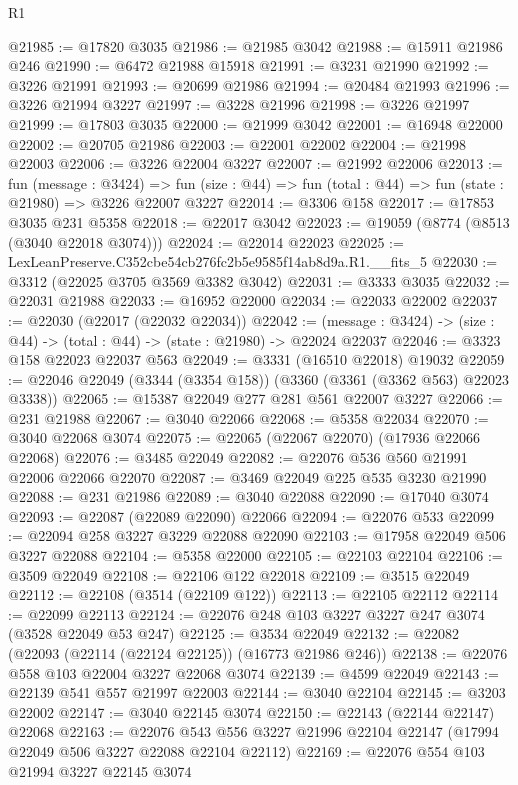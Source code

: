 \begin{lexlean}{R1}
\begin{coremodule}
@21985 := @17820 @3035
@21986 := @21985 @3042
@21988 := @15911 @21986 @246
@21990 := @6472 @21988 @15918
@21991 := @3231 @21990
@21992 := @3226 @21991
@21993 := @20699 @21986
@21994 := @20484 @21993
@21996 := @3226 @21994 @3227
@21997 := @3228 @21996
@21998 := @3226 @21997
@21999 := @17803 @3035
@22000 := @21999 @3042
@22001 := @16948 @22000
@22002 := @20705 @21986
@22003 := @22001 @22002
@22004 := @21998 @22003
@22006 := @3226 @22004 @3227
@22007 := @21992 @22006
@22013 := fun (message : @3424) =>
  fun (size : @44) => fun (total : @44) => fun (state : @21980) => @3226 @22007 @3227
@22014 := @3306 @158
@22017 := @17853 @3035 @231 @5358
@22018 := @22017 @3042
@22023 := @19059 (@8774 (@8513 (@3040 @22018 @3074)))
@22024 := @22014 @22023
@22025 := LexLeanPreserve.C352cbe54cb276fc2b5e9585f14ab8d9a.R1.__fits_5
@22030 := @3312 (@22025 @3705 @3569 @3382 @3042)
@22031 := @3333 @3035
@22032 := @22031 @21988
@22033 := @16952 @22000
@22034 := @22033 @22002
@22037 := @22030 (@22017 (@22032 @22034))
@22042 := (message : @3424) -> (size : @44) -> (total : @44) -> (state : @21980) -> @22024 @22037
@22046 := @3323 @158 @22023 @22037 @563
@22049 := @3331 (@16510 @22018) @19032
@22059 := @22046 @22049 (@3344 (@3354 @158)) (@3360 (@3361 (@3362 @563) @22023 @3338))
@22065 := @15387 @22049 @277 @281 @561 @22007 @3227
@22066 := @231 @21988
@22067 := @3040 @22066
@22068 := @5358 @22034
@22070 := @3040 @22068 @3074
@22075 := @22065 (@22067 @22070) (@17936 @22066 @22068)
@22076 := @3485 @22049
@22082 := @22076 @536 @560 @21991 @22006 @22066 @22070
@22087 := @3469 @22049 @225 @535 @3230 @21990
@22088 := @231 @21986
@22089 := @3040 @22088
@22090 := @17040 @3074
@22093 := @22087 (@22089 @22090) @22066
@22094 := @22076 @533
@22099 := @22094 @258 @3227 @3229 @22088 @22090
@22103 := @17958 @22049 @506 @3227 @22088
@22104 := @5358 @22000
@22105 := @22103 @22104
@22106 := @3509 @22049
@22108 := @22106 @122 @22018
@22109 := @3515 @22049
@22112 := @22108 (@3514 (@22109 @122))
@22113 := @22105 @22112
@22114 := @22099 @22113
@22124 := @22076 @248 @103 @3227 @3227 @247 @3074 (@3528 @22049 @53 @247)
@22125 := @3534 @22049
@22132 := @22082 (@22093 (@22114 (@22124 @22125)) (@16773 @21986 @246))
@22138 := @22076 @558 @103 @22004 @3227 @22068 @3074
@22139 := @4599 @22049
@22143 := @22139 @541 @557 @21997 @22003
@22144 := @3040 @22104
@22145 := @3203 @22002
@22147 := @3040 @22145 @3074
@22150 := @22143 (@22144 @22147) @22068
@22163 := @22076
    @543
    @556
    @3227
    @21996
    @22104
    @22147
    (@17994 @22049 @506 @3227 @22088 @22104 @22112)
@22169 := @22076 @554 @103 @21994 @3227 @22145 @3074

\end{coremodule}
\end{lexlean}
